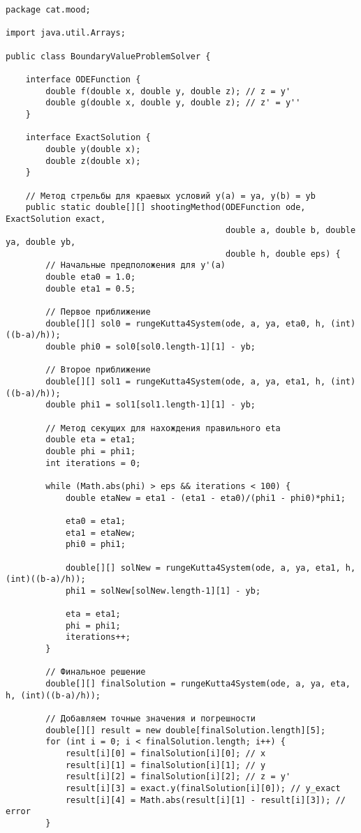 \begin{verbatim}
package cat.mood;

import java.util.Arrays;

public class BoundaryValueProblemSolver {

    interface ODEFunction {
        double f(double x, double y, double z); // z = y'
        double g(double x, double y, double z); // z' = y''
    }

    interface ExactSolution {
        double y(double x);
        double z(double x);
    }

    // Метод стрельбы для краевых условий y(a) = ya, y(b) = yb
    public static double[][] shootingMethod(ODEFunction ode, ExactSolution exact,
                                            double a, double b, double ya, double yb,
                                            double h, double eps) {
        // Начальные предположения для y'(a)
        double eta0 = 1.0;
        double eta1 = 0.5;

        // Первое приближение
        double[][] sol0 = rungeKutta4System(ode, a, ya, eta0, h, (int)((b-a)/h));
        double phi0 = sol0[sol0.length-1][1] - yb;

        // Второе приближение
        double[][] sol1 = rungeKutta4System(ode, a, ya, eta1, h, (int)((b-a)/h));
        double phi1 = sol1[sol1.length-1][1] - yb;

        // Метод секущих для нахождения правильного eta
        double eta = eta1;
        double phi = phi1;
        int iterations = 0;

        while (Math.abs(phi) > eps && iterations < 100) {
            double etaNew = eta1 - (eta1 - eta0)/(phi1 - phi0)*phi1;

            eta0 = eta1;
            eta1 = etaNew;
            phi0 = phi1;

            double[][] solNew = rungeKutta4System(ode, a, ya, eta1, h, (int)((b-a)/h));
            phi1 = solNew[solNew.length-1][1] - yb;

            eta = eta1;
            phi = phi1;
            iterations++;
        }

        // Финальное решение
        double[][] finalSolution = rungeKutta4System(ode, a, ya, eta, h, (int)((b-a)/h));

        // Добавляем точные значения и погрешности
        double[][] result = new double[finalSolution.length][5];
        for (int i = 0; i < finalSolution.length; i++) {
            result[i][0] = finalSolution[i][0]; // x
            result[i][1] = finalSolution[i][1]; // y
            result[i][2] = finalSolution[i][2]; // z = y'
            result[i][3] = exact.y(finalSolution[i][0]); // y_exact
            result[i][4] = Math.abs(result[i][1] - result[i][3]); // error
        }


\end{verbatim}
